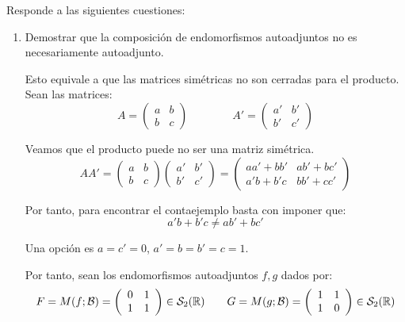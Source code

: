 \begin{ejercicio} Responde a las siguientes cuestiones:
\begin{enumerate}
    \item Demostrar que la composición de endomorfismos autoadjuntos no es necesariamente autoadjunto.

    Esto equivale a que las matrices simétricas no son cerradas para el producto. Sean las matrices:
    \begin{equation*}
        A=\left(\begin{array}{cc}
            a & b \\
            b & c
        \end{array}\right)
        \qquad \qquad
        A'=\left(\begin{array}{cc}
            a' & b' \\
            b' & c'
        \end{array}\right)
    \end{equation*}

    Veamos que el producto puede no ser una matriz simétrica.
    \begin{equation*}
        AA'=\left(\begin{array}{cc}
            a & b \\
            b & c
        \end{array}\right)\left(\begin{array}{cc}
            a' & b' \\
            b' & c'
        \end{array}\right)
        = \left(\begin{array}{cc}
            aa'+bb' & ab'+bc' \\
            a'b+b'c & bb'+cc'
        \end{array}\right)
    \end{equation*}

    Por tanto, para encontrar el contaejemplo basta con imponer que:
    \begin{equation*}
        a'b+b'c \neq ab'+bc'
    \end{equation*}

    Una opción es $a=c'=0$, $a'=b=b'=c=1$.

    Por tanto, sean los endomorfismos autoadjuntos $f,g$ dados por:
    \begin{equation*}
        F=M(f;\mathcal{B})=\left(\begin{array}{cc}
            0 & 1 \\
            1 & 1
        \end{array}\right)  \in \mathcal{S}_2(\mathbb{R})
        \qquad
        G=M(g;\mathcal{B})=\left(\begin{array}{cc}
            1 & 1 \\
            1 & 0
        \end{array}\right) \in \mathcal{S}_2(\mathbb{R})
    \end{equation*}


\end{enumerate}
\end{ejercicio}
